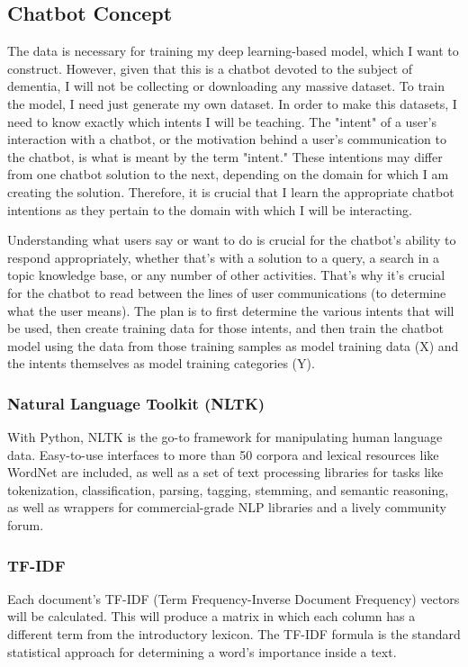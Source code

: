 \subsection{Chatbot Concept}
The data is necessary for training my deep learning-based model, which I want to construct. However, given that this is a chatbot devoted to the subject of dementia, I will not be collecting or downloading any massive dataset. To train the model, I need just generate my own dataset. In order to make this datasets, I need to know exactly which intents I will be teaching. The "intent" of a user's interaction with a chatbot, or the motivation behind a user's communication to the chatbot, is what is meant by the term "intent." These intentions may differ from one chatbot solution to the next, depending on the domain for which I am creating the solution. Therefore, it is crucial that I learn the appropriate chatbot intentions as they pertain to the domain with which I will be interacting.

Understanding what users say or want to do is crucial for the chatbot's ability to respond appropriately, whether that's with a solution to a query, a search in a topic knowledge base, or any number of other activities. That's why it's crucial for the chatbot to read between the lines of user communications (to determine what the user means). The plan is to first determine the various intents that will be used, then create training data for those intents, and then train the chatbot model using the data from those training samples as model training data (X) and the intents themselves as model training categories (Y).

\subsubsection{Natural Language Toolkit (NLTK)}
With Python, NLTK is the go-to framework for manipulating human language data. Easy-to-use interfaces to more than 50 corpora and lexical resources like WordNet are included, as well as a set of text processing libraries for tasks like tokenization, classification, parsing, tagging, stemming, and semantic reasoning, as well as wrappers for commercial-grade NLP libraries and a lively community forum.

\subsubsection{TF-IDF}
Each document's TF-IDF (Term Frequency-Inverse Document Frequency) vectors will be calculated. This will produce a matrix in which each column has a different term from the introductory lexicon. The TF-IDF formula is the standard statistical approach for determining a word's importance inside a text. 

